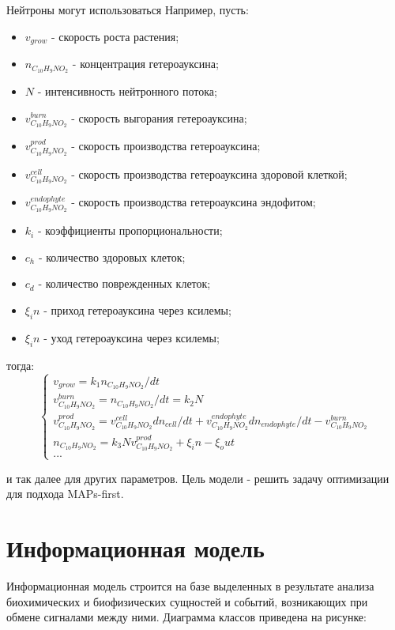 \documentclass[11pt]{article}
\begin{document}
	Нейтроны могут использоваться
	Например, пусть:
			\begin{itemize} 
		\item $v_{grow}$ - скорость роста растения;
		\item $n_{C_{10}H_{9}NO_2}$ - концентрация гетероауксина;
		\item $N$ - интенсивность нейтронного потока;
		\item $v^{burn}_{C_{10}H_{9}NO_2}$ - скорость выгорания гетероауксина;
		\item $v^{prod}_{C_{10}H_{9}NO_2}$ - скорость производства гетероауксина;
		\item $v^{cell}_{C_{10}H_{9}NO_2}$ - скорость производства гетероауксина здоровой клеткой;
		\item $v^{endophyte}_{C_{10}H_{9}NO_2}$ - скорость производства гетероауксина эндофитом;
		\item $k_i$ - коэффициенты пропорциональности;
		\item $c_h$ - количество здоровых клеток;
		\item $c_d$ - количество поврежденных клеток;
		\item $\xi_in$ - приход гетероауксина через ксилемы;
		\item $\xi_in$ - уход гетероауксина через ксилемы;
	\end{itemize} 
	тогда:
		\begin{equation}
		\label{eq5}
		\begin{cases}
			v_{grow} = k_1 n_{C_{10}H_{9}NO_2}/dt \\
			v^{burn}_{C_{10}H_{9}NO_2}= n_{C_{10}H_{9}NO_2}/dt = k_2 N \\
			v^{prod}_{C_{10}H_{9}NO_2} = v^{cell}_{C_{10}H_{9}NO_2} dn_{cell}/dt + v^{endophyte}_{C_{10}H_{9}NO_2} dn_{endophyte}/dt - v^{burn}_{C_{10}H_{9}NO_2} \\
			n_{C_{10}H_{9}NO_2} = k_3 N v^{prod}_{C_{10}H_{9}NO_2}+\xi_in - \xi_out \\
			...
		\end{cases}
	\end{equation}

	и так далее для других параметров. Цель модели - решить задачу оптимизации для подхода MAPs-first.
	
	\section{Информационная модель}
	Информационная модель строится на базе выделенных в результате анализа биохимических и биофизических сущностей и событий, возникающих при обмене сигналами между ними. Диаграмма классов приведена на рисунке:
	
\end{document}
